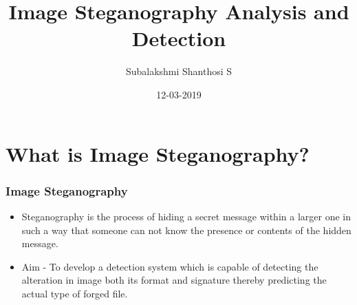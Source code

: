 \documentclass{beamer} %
\title{Image Steganography Analysis and Detection}
\author{Subalakshmi Shanthosi S}
\institute{SSN College of Engineering}
\date{}
\date[short date]{12-03-2019}
\theoremstyle{definition} %
\begin{document}
\begin{frame} 
\titlepage
\end{frame}

\section{What is Image Steganography?} %

\begin{frame} 
\frametitle{Image Steganography}
 \begin{itemize}
 \item{Steganography is the process of hiding a secret message within a
 larger one in such a way that someone can not know the presence or contents
 of the hidden message. }
\end{itemize}
\begin{itemize}
 \item{Aim - To develop a detection system which is capable of detecting the alteration in image both its format and signature thereby predicting the actual type of forged file.}
\end{itemize}

\end{frame}
\end{document}
